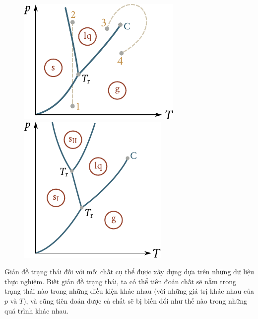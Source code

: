 \begin{figure}[!htb]
	\begin{minipage}[t]{0.5\linewidth}
		\begin{center}
			\includegraphics[scale=1]{figures/ch_15/fig_15_17.pdf}
			\caption[]{}
			\label{fig:15_17}
		\end{center}
	\end{minipage}
	\hspace{-0.05cm}
	\begin{minipage}[t]{0.5\linewidth}
		\begin{center}
			\includegraphics[scale=1]{figures/ch_15/fig_15_18.pdf}
			\caption[]{}
			\label{fig:15_18}
		\end{center}
	\end{minipage}
\end{figure}

Giản đồ trạng thái đối với mỗi chất cụ thể được xây dựng dựa trên những dữ liệu thực nghiệm. Biết giản đồ trạng thái, ta có thể tiên đoán chất sẽ nằm trong trạng thái nào trong những điều kiện khác nhau (với những giá trị khác nhau của $p$ và $T$), và cũng tiên đoán được cả chất sẽ bị biến đổi như thế nào trong những quá trình khác nhau.\\

